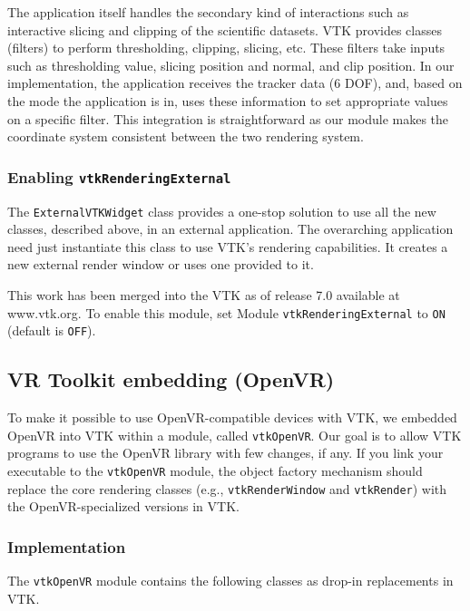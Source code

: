 The application itself handles the secondary kind of interactions such as interactive slicing and clipping of the scientific datasets. VTK provides classes (filters) to perform thresholding, clipping, slicing, etc. These filters take inputs such as thresholding value, slicing position and normal, and clip position.  In our implementation, the application receives the tracker data (6 DOF), and, based on the mode the application is in, uses these information to set appropriate values on a specific filter. This integration is straightforward as our module makes the coordinate system consistent between the two rendering system.

\subsubsection{Enabling \texttt{vtkRenderingExternal}}

The \texttt{ExternalVTKWidget} class provides a one-stop solution to use all the new classes, described above, in an external application. The overarching application need just instantiate this class to use VTK's rendering capabilities. It creates a new external render window or uses one provided to it.

This work has been merged into the VTK as of release 7.0 available at www.vtk.org. To enable this module, set Module \texttt{vtkRenderingExternal} to \texttt{ON} (default is \texttt{OFF}).

\subsection{VR Toolkit embedding (OpenVR)}

To make it possible to use OpenVR-compatible devices with VTK, we embedded OpenVR into VTK within a module, called \texttt{vtkOpenVR}. Our goal is to allow VTK programs to use the OpenVR library with few changes, if any. If you link your executable to the \texttt{vtkOpenVR} module, the object factory mechanism should replace the core rendering classes (e.g., \texttt{vtkRenderWindow} and \texttt{vtkRender}) with the OpenVR-specialized versions in VTK. 

\subsubsection{Implementation}

The \texttt{vtkOpenVR} module contains the following classes as drop-in replacements in VTK.

